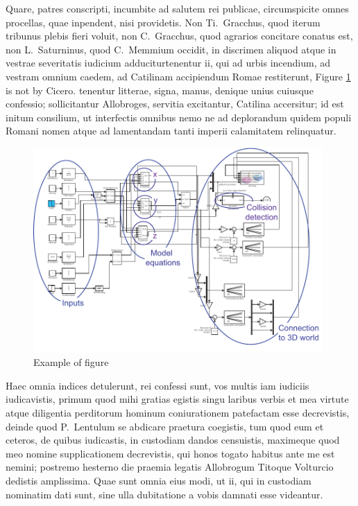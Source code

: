 \documentclass[12pt, a4paper, twoside, english]{report}
\begin{document}
	Quare, patres conscripti, incumbite ad salutem rei publicae,
	circumspicite omnes procellas, quae inpendent, nisi providetis. Non
	Ti.~Gracchus, quod iterum tribunus plebis fieri voluit, non
	C.~Gracchus, quod agrarios concitare conatus est, non L.~Saturninus,
	quod C.~Memmium occidit, in discrimen aliquod atque in vestrae
	severitatis iudicium adduciturtenentur ii, qui ad urbis incendium, ad
	vestram omnium caedem, ad Catilinam accipiendum Romae restiterunt,
	Figure \ref{fig:model_block} is not by Cicero.
	tenentur litterae, signa, manus, denique unius cuiusque confessio;
	sollicitantur Allobroges, servitia excitantur, Catilina accersitur; id
	est initum consilium, ut interfectis omnibus nemo ne ad deplorandum
	quidem populi Romani nomen atque ad lamentandam tanti imperii
	calamitatem relinquatur.
	
		\begin{figure}
		\begin{center}
			\includegraphics[width=11cm]{Figures/block_simulink.pdf} 
		\end{center}
		\caption{Example of figure}
		\label{fig:model_block}
	\end{figure}
	
	
	Haec omnia indices detulerunt, rei confessi sunt, vos multis iam iudiciis
	iudicavistis, primum quod mihi gratias egistis singu laribus verbis et
	mea virtute atque diligentia perditorum hominum coniurationem patefactam
	esse decrevistis, deinde quod P.~Lentulum se abdicare praetura
	coegistis, tum quod eum et ceteros, de quibus iudicastis, in custodiam
	dandos censuistis, maximeque quod meo nomine supplicationem decrevistis,
	qui honos togato habitus ante me est nemini; postremo hesterno die
	praemia legatis Allobrogum Titoque Volturcio dedistis amplissima. Quae
	sunt omnia eius modi, ut ii, qui in custodiam nominatim dati sunt, sine
	ulla dubitatione a vobis damnati esse videantur.
	
\end{document}
